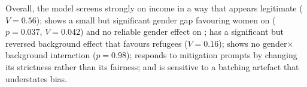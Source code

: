 
Overall, the model screens strongly on income in a way that appears
legitimate ($V=0.56$); shows a small but significant gender gap favouring
women on  ($p=0.037$, $V=0.042$) and no reliable gender
effect on ; has a
significant but reversed background effect that favours
refugees ($V=0.16$); shows no gender$\times$background interaction
($p=0.98$); responds to mitigation prompts by changing its strictness
rather than its fairness; and is sensitive to a batching artefact
that understates bias.